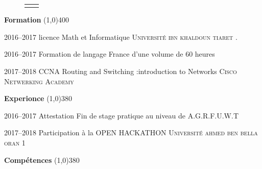 \documentclass{scrartcl}
\begin{document}
\begin{cv}{}
\begin{figure}[!h]
\begin{tabular}{r l}
\begin{minipage}[!h]{.25\textwidth}
 \end{minipage}    
\end{tabular}
 
\end{figure} 		  

 
 
 
\textbf{{\Large{\color{blue}For}mation }}\line(1,0){400}                       
  \begin{cvlist}{ }
  	\item[{\color{blue}2016--2017}] licence  Math et Informatique      \textsc{Universit\'e ibn khaldoun tiaret} .
  	\item[{\color{blue}2016--2017}] Formation de langage France d'une volume de 60 heures  
	\item[{\color{blue}2017--2018}] CCNA Routing and Switching :introduction to Networks \textsc{Cisco Netwerking Academy}
\end{cvlist}
 \textbf{{\Large{\color{blue}Exp}erionce }}\line(1,0){380}  
                                                                          
	\begin{cvlist}{ }
 	\item[{\color{blue}2016--2017}] Attestation Fin de stage pratique au niveau de A.G.R.F.U.W.T 
	 	\item[{\color{blue}2017--2018}] Participation à la OPEN HACKATHON \textsc{ Universit\'e ahmed ben bella oran 1}
	\end{cvlist} 	                                                                                                                                
 


 \textbf{{\Large{\color{blue}Com}pétences }}\line(1,0){380}  


\end{cv}
\end{document}
